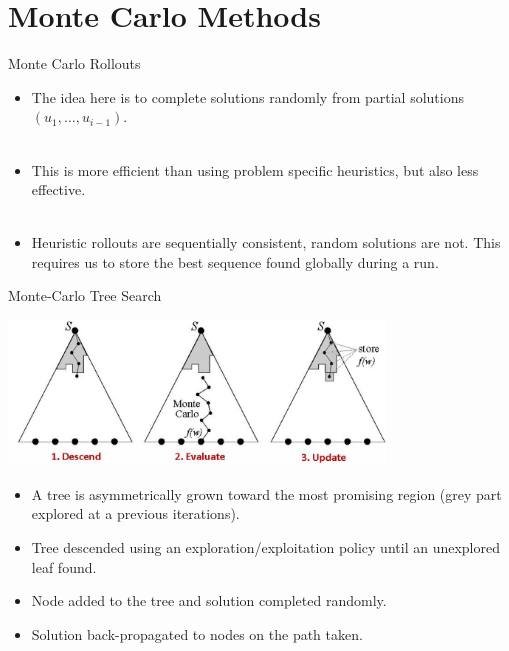 \documentclass[
	mode=present,
	paper=screen,
	orient=landscape,
	display=slides,
	style=simple
	]{powerdot}
\begin{document}
\section[slide=false]{Monte Carlo Methods}
\begin{slide}{Monte Carlo Rollouts}

\begin{itemize}
\item The idea here is to complete solutions randomly from partial solutions $(u_1,\ldots,u_{i-1})$.\\ \ \\ \pause
\item This is more efficient than using problem specific heuristics, but also less effective.\\ \ \\ \pause
\item Heuristic rollouts are sequentially consistent, random solutions are not. This requires us to store the 
best sequence found globally during a run.
\end{itemize}


\end{slide}

\begin{slide}{Monte-Carlo Tree Search}
\begin{minipage}[c]{1.25in}
	\includegraphics[width=10cm]{mcts.eps}
\end{minipage}
\begin{itemize}
\item A tree is asymmetrically grown toward the most promising region (grey part explored at a previous 
iterations).\pause
\item Tree descended using an exploration/exploitation policy until an unexplored leaf found.\pause
\item Node added to the tree and solution completed randomly.\pause
\item Solution back-propagated to nodes on the path taken.
\end{itemize}
\end{slide}
\end{document}
